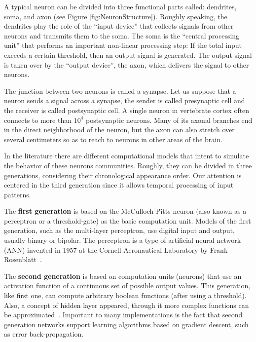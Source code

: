 A typical neuron can be divided into three functional parts called: dendrites, soma, and axon (see Figure \ref{fig:NeuronStructure}). Roughly speaking, the dendrites play the role of the ``input device'' that collects signals from other neurons and transmits them to the soma. The soma is the ``central processing unit'' that performs an important non-linear processing step: If the total input exceeds a certain threshold, then an output signal is generated. The output signal is taken over by the ``output device'', the axon, which delivers the signal to other neurons.

The junction between two neurons is called a synapse. Let us suppose that a neuron sends a signal across a synapse, the sender is called presynaptic cell and the receiver is called postsynaptic cell. A single neuron in vertebrate cortex often connects to more than $10^4$ postsynaptic neurons. Many of its axonal branches end in the direct neighborhood of the neuron, but the axon can also stretch over several centimeters so as to reach to neurons in other areas of the brain.

In the literature there are different computational models that intent to simulate the behavior of these neurons communities. Roughly, they can be divided in three generations, considering their chronological appearance order. Our attention is centered in the third generation since it allows temporal processing of input patterns.

The \textbf{first generation} is based on the McCulloch-Pitts neuron (also known as a perceptron or a threshold-gate) as the basic computation unit. Models of the first generation, such as the multi-layer perceptron, use digital input and output, usually binary or bipolar. The perceptron is a type of artificial neural network (ANN) invented in 1957 at the Cornell Aeronautical Laboratory by Frank Rosenblatt~\cite{Rosenblatt1960}.

The \textbf{second generation} is based on computation units (neurons) that use an activation function of a continuous set of possible output values.%
This generation, like first one, can compute arbitrary boolean functions (after using a threshold). Also, a concept of hidden layer appeared, through it more complex functions can be approximated~\cite{Rosenblatt1962}. Important to many implementations is the fact that second generation networks support learning algorithms based on gradient descent, such as error back-propagation.

